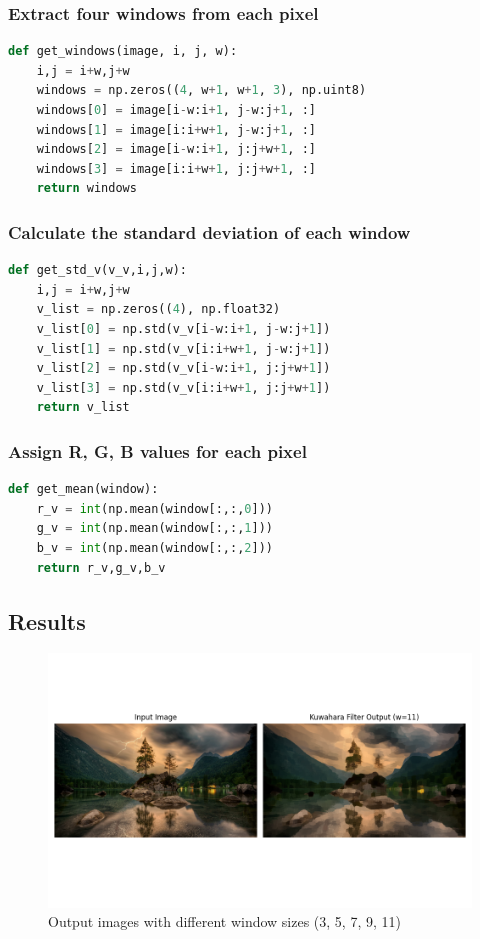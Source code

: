 \documentclass{article}
\begin{document}
\subsubsection{Extract four windows from each pixel}
\begin{lstlisting}[language=Python]
def get_windows(image, i, j, w):
    i,j = i+w,j+w
    windows = np.zeros((4, w+1, w+1, 3), np.uint8)
    windows[0] = image[i-w:i+1, j-w:j+1, :]
    windows[1] = image[i:i+w+1, j-w:j+1, :]
    windows[2] = image[i-w:i+1, j:j+w+1, :]
    windows[3] = image[i:i+w+1, j:j+w+1, :]
    return windows
\end{lstlisting}

\subsubsection{Calculate the standard deviation of each window }
\begin{lstlisting}[language=Python]
def get_std_v(v_v,i,j,w):
    i,j = i+w,j+w
    v_list = np.zeros((4), np.float32)
    v_list[0] = np.std(v_v[i-w:i+1, j-w:j+1])
    v_list[1] = np.std(v_v[i:i+w+1, j-w:j+1])
    v_list[2] = np.std(v_v[i-w:i+1, j:j+w+1])
    v_list[3] = np.std(v_v[i:i+w+1, j:j+w+1])
    return v_list
\end{lstlisting}

\subsubsection{Assign R, G, B values for each pixel}
\begin{lstlisting}[language=Python]
def get_mean(window):
    r_v = int(np.mean(window[:,:,0]))
    g_v = int(np.mean(window[:,:,1]))
    b_v = int(np.mean(window[:,:,2]))
    return r_v,g_v,b_v
\end{lstlisting}

\subsection{Results}
\begin{figure}[H]
    \centering
    \includegraphics[width=0.9\linewidth]{Compare.png}
    \caption{Output images with different window sizes  (3, 5, 7, 9, 11)}
    \label{fig:enter-label}
\end{figure}
\end{document}
